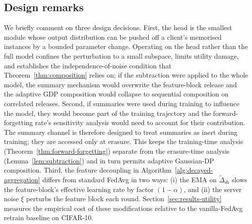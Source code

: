\subsection{Design remarks}
\label{sec:method-remarks}

We briefly comment on three design decisions. First, the head is the smallest module
whose output distribution can be pushed off a client's memorised instances by a bounded
parameter change. Operating on the head rather than the full model confines the
perturbation to a small subspace, limits utility damage, and establishes the
independence-of-noise condition that Theorem~\ref{thm:composition} relies on; if the
subtraction were applied to the whole model, the summary mechanism would overwrite the
feature-block release and the adaptive GDP composition would collapse to sequential
composition on correlated releases. Second, if summaries were used
during training to influence the model, they would become part of the training
trajectory and the forward-forgetting rate's sensitivity analysis would need to account
for their contribution. The summary channel is therefore designed to treat summaries as
inert during training; they are accessed only at erasure. This keeps the training-time
analysis (Theorem~\ref{thm:forward-forgetting}) separate from the erasure-time analysis
(Lemma~\ref{lem:subtraction}) and in turn permits adaptive Gaussian-DP composition. Third, the
feature decoupling in Algorithm~\ref{alg:decayed-aggregation} differs from standard
FedAvg in two ways: (i) the EMA on $\tilde\Delta_\mathrm{sh}$ slows the feature-block's
effective learning rate by factor $(1-\alpha)$, and (ii) the server noise $\xi$ perturbs
the feature block each round. Section~\ref{sec:results-utility} measures the empirical
cost of these modifications relative to the vanilla-FedAvg retrain baseline on
CIFAR-10.
